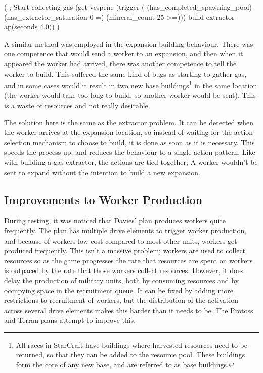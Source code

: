 \documentclass[11pt,openright,a4paper]{report}
\begin{document}
\begin{Code}[frame=single,language=Lisp,tabsize=4,breaklines,breakatwhitespace,caption={The current POSH drive to begin collecting gas},label=newGasPOSH]
(
	; Start collecting gas
	(get-vespene (trigger (	(has_completed_spawning_pool)
							(has_extractor_saturation 0 =)
							(mineral_count 25 >=)))
		build-extractor-ap(seconds 4.0))
)
\end{Code}

A similar method was employed in the expansion building behaviour. There was one competence that would send a worker to an expansion, and then when it appeared the worker had arrived, there was another competence to tell the worker to build. This suffered the same kind of bugs as starting to gather gas, and in some cases would it result in two new base buildings\footnote{All races in StarCraft have buildings where harvested resources need to be returned, so that they can be added to the resource pool. These buildings form the core of any new base, and are referred to as base buildings.} in the same location (the worker would take too long to build, so another worker would be sent). This is a waste of resources and not really desirable.

The solution here is the same as the extractor problem. It can be detected when the worker arrives at the expansion location, so instead of waiting for the action selection mechanism to choose to build, it is done as soon as it is necessary. This speeds the process up, and reduces the behaviour to a single action pattern. Like with building a gas extractor, the actions are tied together; A worker wouldn't be sent to expand without the intention to build a new expansion.

\subsection{Improvements to Worker Production}
\label{workerProd}
During testing, it was noticed that Davies' plan produces workers quite frequently. The plan has multiple drive elements to trigger worker production, and because of workers low cost compared to most other units, workers get produced frequently. This isn't a massive problem; workers are used to collect resources so as the game progresses the rate that resources are spent on workers is outpaced by the rate that those workers collect resources. However, it does delay the production of military units, both by consuming resources and by occupying space in the recruitment queue. It can be fixed by adding more restrictions to recruitment of workers, but the distribution of the activation across several drive elements makes this harder than it needs to be. The Protoss and Terran plans attempt to improve this.
\end{document}
